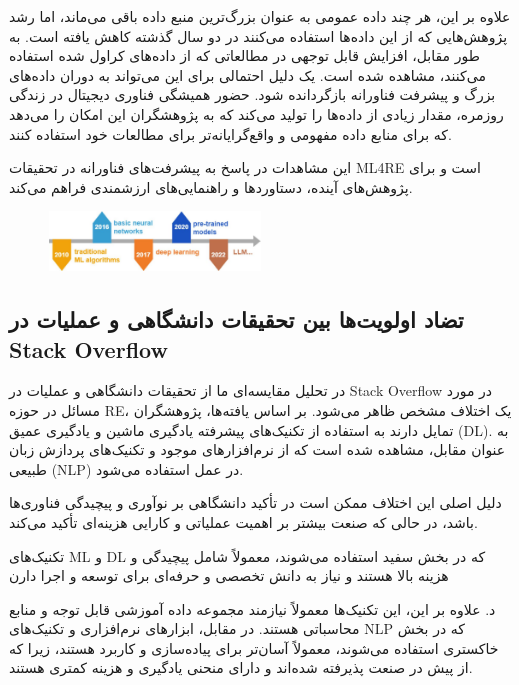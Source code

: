 \documentclass[a4paper,10pt]{article}
\begin{document}
            علاوه بر این، هر چند داده عمومی به عنوان بزرگ‌ترین منبع داده باقی می‌ماند، اما رشد پژوهش‌هایی که از این داده‌ها استفاده می‌کنند در دو سال گذشته کاهش یافته است. به طور مقابل، افزایش قابل توجهی در مطالعاتی که از داده‌های کراول شده استفاده می‌کنند، مشاهده شده است. یک دلیل احتمالی برای این می‌تواند به دوران داده‌های بزرگ و پیشرفت فناورانه بازگردانده شود. حضور همیشگی فناوری دیجیتال در زندگی روزمره، مقدار زیادی از داده‌ها را تولید می‌کند که به پژوهشگران این امکان را می‌دهد که برای منابع داده مفهومی و واقع‌گرایانه‌تر برای مطالعات خود استفاده کنند.

            این مشاهدات در پاسخ به پیشرفت‌های فناورانه در تحقیقات ML4RE است و برای پژوهش‌های آینده، دستاوردها و راهنمایی‌های ارزشمندی فراهم می‌کند.

            \begin{figure}
                \centering
                \includegraphics[width=0.5\textwidth]{Image/fig-19.jpg}
            \end{figure}

        \subsection{تضاد اولویت‌ها بین تحقیقات دانشگاهی و عملیات در Stack Overflow}

            در تحلیل مقایسه‌ای ما از تحقیقات دانشگاهی و عملیات در Stack Overflow در مورد مسائل در حوزه RE، یک اختلاف مشخص ظاهر می‌شود. بر اساس یافته‌ها، پژوهشگران تمایل دارند به استفاده از تکنیک‌های پیشرفته یادگیری ماشین و یادگیری عمیق (DL). به عنوان مقابل، مشاهده شده است که از نرم‌افزارهای موجود و تکنیک‌های پردازش زبان طبیعی (NLP) در عمل استفاده می‌شود.

            دلیل اصلی این اختلاف ممکن است در تأکید دانشگاهی بر نوآوری و پیچیدگی فناوری‌ها باشد، در حالی که صنعت بیشتر بر اهمیت عملیاتی و کارایی هزینه‌ای تأکید می‌کند.

            تکنیک‌های ML و DL که در بخش سفید استفاده می‌شوند، معمولاً شامل پیچیدگی و هزینه بالا هستند و نیاز به دانش تخصصی و حرفه‌ای برای توسعه و اجرا دارن

            د. علاوه بر این، این تکنیک‌ها معمولاً نیازمند مجموعه داده آموزشی قابل توجه و منابع محاسباتی هستند. در مقابل، ابزارهای نرم‌افزاری و تکنیک‌های NLP که در بخش خاکستری استفاده می‌شوند، معمولاً آسان‌تر برای پیاده‌سازی و کاربرد هستند، زیرا که از پیش در صنعت پذیرفته شده‌اند و دارای منحنی یادگیری و هزینه کمتری هستند.
\end{document}
